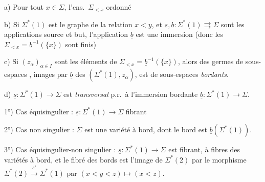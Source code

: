 \documentclass[11pt,a4paper]{article}
\begin{document}


a) Pour tout $x\in\Sigma$, l'ens.\ $\Sigma_{<x}$    ordonné

b) Si $\Sigma^{*}(1)$ est le graphe de la relation $x<y$, et $\underline s,\underline b : \Sigma^{*}(1)\rightrightarrows\Sigma$ sont les applications source et but, l'application $\underline b$ est une immersion \struck{\ill{}}  (donc les $\Sigma_{<x}=\underline b^{-1}(\lbrace x\rbrace)$ sont finis)

c) Si $(z_\alpha)_{\alpha\in I}$ sont les éléments de $\Sigma_{<x}=\underline b^{-1}(\lbrace x\rbrace)$, alors  des \struck{\ill{}} germes  de sous-espaces  , images par $\underline b$ des $(\Sigma^{*}(1),z_\alpha)$, est  \struck{\ill{}}  de sous-espaces \emph{bordants}.

d) $\underline s : \Sigma^{*}(1)\to\Sigma$ est \emph{transversal} p.r.\ à l'immersion bordante $\underline b : \Sigma^{*}(1)\to\Sigma$. \struck{\ill{}}


1°) Cas équisingulier : $\underline s : \Sigma^{*}(1)\to\Sigma$ fibrant 

2°) Cas non singulier : $\Sigma$ est une variété à bord, dont le bord est $\underline b(\Sigma^{*}(1))$.

3°) Cas équisingulier-non singulier : $\underline s : \Sigma^{*}(1)\to\Sigma$ est  fibrant, à fibres des variétés à bord, et le fibré des bords est l'image de $\Sigma^{*}(2)$ par le morphisme $\Sigma^{*}(2)\xrightarrow{\underline s'}\Sigma^{*}(1)$ \struck{\ill{}}  par $(x<y<z)\longmapsto(x<z)$.

\end{document}
